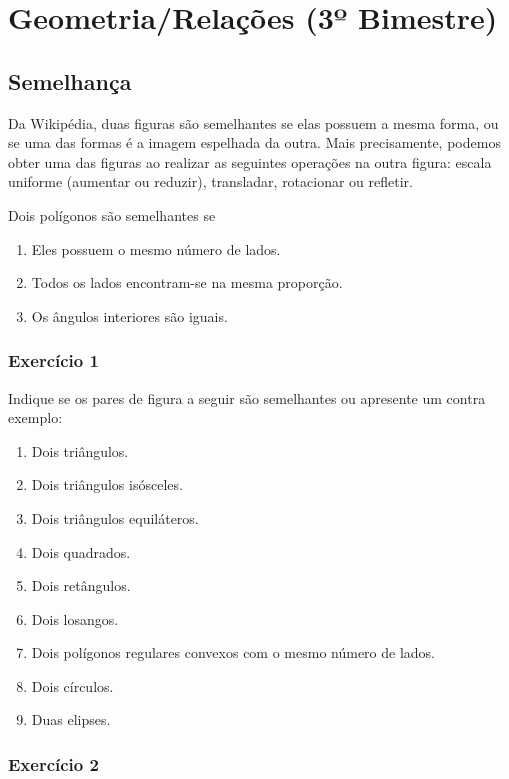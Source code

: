 \chapter{Geometria/Relações (3º Bimestre)}

\section{Semelhança}

Da Wikipédia, duas figuras são semelhantes se elas possuem a mesma
forma, ou se uma das formas é a imagem espelhada da outra. Mais precisamente,
podemos obter uma das figuras ao realizar as seguintes operações na outra
figura: escala uniforme (aumentar ou reduzir), transladar, rotacionar ou
refletir.

Dois polígonos são semelhantes se

\begin{enumerate}
  \item Eles possuem o mesmo número de lados.
  \item Todos os lados encontram-se na mesma proporção.
  \item Os ângulos interiores são iguais.
\end{enumerate}

\subsection{Exercício 1}

Indique se os pares de figura a seguir são semelhantes ou apresente um
contra exemplo:

\begin{enumerate}
  \item Dois triângulos.
  \item Dois triângulos isósceles.
  \item Dois triângulos equiláteros.
  \item Dois quadrados.
  \item Dois retângulos.
  \item Dois losangos.
  \item Dois polígonos regulares convexos com o mesmo número de lados.
  \item Dois círculos.
  \item Duas elipses.
\end{enumerate}

\subsection{Exercício 2}

